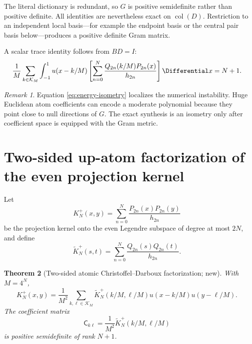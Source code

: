 \documentclass[11pt,oneside]{article}
\numberwithin{equation}{section}
\newtheorem{theorem}{Theorem}[section]
\theoremstyle{definition}
\theoremstyle{remark}
\newtheorem{remark}[theorem]{Remark}
\begin{document}
The literal dictionary is redundant, so $G$ is positive semidefinite rather
than positive definite.  All identities are nevertheless exact on
$\operatorname{col}(D)$.  Restriction to an independent local basis---for
example the endpoint basis or the central pair basis below---produces a
positive definite Gram matrix.

A scalar trace identity follows from $BD=I$:
\begin{equation}
 \frac1M\sum_{k\in\mathcal K_M}\int_{-1}^{1}u(x-k/M)
 \left[\sum_{n=0}^{N}\frac{Q_{2n}(k/M)P_{2n}(x)}{h_{2n}}\right]\Differential x=N+1.
 \label{eq:trace-integral}
\end{equation}

\begin{remark}
Equation \eqref{eq:energy-isometry} localizes the numerical instability.
Huge Euclidean atom coefficients can encode a moderate polynomial because they
point close to null directions of $G$.  The exact synthesis is an isometry only
after coefficient space is equipped with the Gram metric.
\end{remark}

\section{Two-sided up-atom factorization of the even projection kernel}
\label{sec:tensor-kernel}

Let
\begin{equation}
 K_N^+(x,y)=\sum_{n=0}^{N}\frac{P_{2n}(x)P_{2n}(y)}{h_{2n}}
 \label{eq:even-kernel}
\end{equation}
be the projection kernel onto the even Legendre subspace of degree at most
$2N$, and define
\begin{equation}
 \widetilde K_N^+(s,t)=\sum_{n=0}^{N}
 \frac{Q_{2n}(s)Q_{2n}(t)}{h_{2n}}.
 \label{eq:even-deconv-kernel}
\end{equation}

\begin{theorem}[Two-sided atomic Christoffel--Darboux factorization; new]
\label{thm:two-sided-kernel}
With $M=4^N$,
\begin{equation}
 \boxed{
 K_N^+(x,y)=\frac1{M^2}\sum_{k,\ell\in\mathcal K_M}
 \widetilde K_N^+(k/M,\ell/M)
 u(x-k/M)u(y-\ell/M).}
 \label{eq:two-sided-kernel}
\end{equation}
The coefficient matrix
\begin{equation}
 \mathsf C_{k\ell}=\frac1{M^2}\widetilde K_N^+(k/M,\ell/M)
 \label{eq:kernel-coef-matrix}
\end{equation}
is positive semidefinite of rank $N+1$.
\end{theorem}
\end{document}
